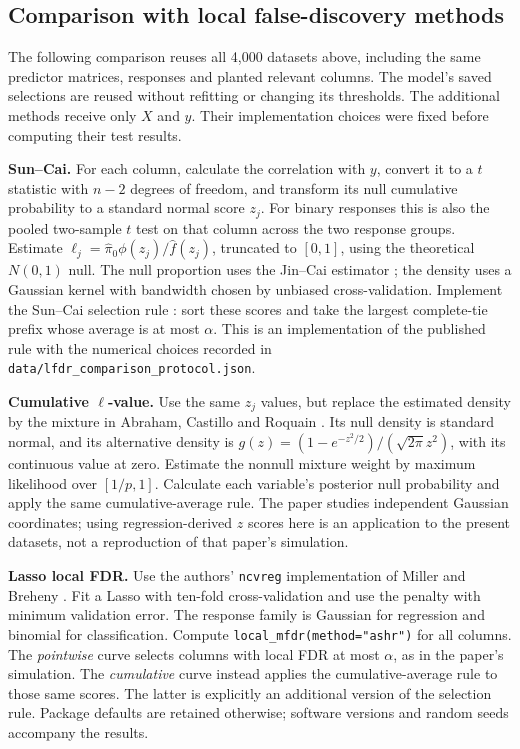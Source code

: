 \documentclass[10pt,letterpaper]{article}
\newcommand{\code}[1]{\nolinkurl{#1}}
\begin{document}

\subsection{Comparison with local false-discovery methods}
The following comparison reuses all 4,000 datasets above, including the
same predictor matrices, responses and planted relevant columns.
The model's saved selections are reused without refitting or changing its
thresholds. The additional methods receive only $X$ and $y$.
Their implementation choices were fixed before computing their test results.

\textbf{Sun--Cai.} For each column, calculate the correlation with $y$,
convert it to a $t$ statistic with $n-2$ degrees of freedom, and transform
its null cumulative probability to a standard normal score $z_j$.
For binary responses this is also the pooled two-sample $t$ test on that
column across the two response groups. Estimate
$\ell_j=\widehat\pi_0\phi(z_j)/\widehat f(z_j)$, truncated to $[0,1]$,
using the theoretical $N(0,1)$ null. The null proportion uses the
Jin--Cai estimator \cite{jincai}; the density uses a Gaussian kernel with
bandwidth chosen by unbiased cross-validation. Implement the Sun--Cai
selection rule \cite{suncai}: sort these scores and take the largest
complete-tie prefix whose average is at most $\alpha$.
This is an implementation of the published rule with the numerical choices
recorded in \code{data/lfdr_comparison_protocol.json}.

\textbf{Cumulative $\ell$-value.} Use the same $z_j$ values, but replace
the estimated density by the mixture in Abraham, Castillo and Roquain
\cite{cumulativeell}. Its null density is standard normal, and its
alternative density is
$g(z)=(1-e^{-z^2/2})/(\sqrt{2\pi}z^2)$, with its continuous value at zero.
Estimate the nonnull mixture weight by maximum likelihood over $[1/p,1]$.
Calculate each variable's posterior null probability and apply the same
cumulative-average rule. The paper studies independent Gaussian
coordinates; using regression-derived $z$ scores here is an application
to the present datasets, not a reproduction of that paper's simulation.

\textbf{Lasso local FDR.} Use the authors' \code{ncvreg} implementation
of Miller and Breheny \cite{millerbreheny}. Fit a Lasso with ten-fold
cross-validation and use the penalty with minimum validation error.
The response family is Gaussian for regression and binomial for
classification. Compute \code{local_mfdr(method="ashr")} for all columns.
The \emph{pointwise} curve selects columns with local FDR at most $\alpha$,
as in the paper's simulation. The \emph{cumulative} curve instead applies
the cumulative-average rule to those same scores. The latter is explicitly
an additional version of the selection rule. Package defaults are retained
otherwise; software versions and random seeds accompany the results.
\end{document}

